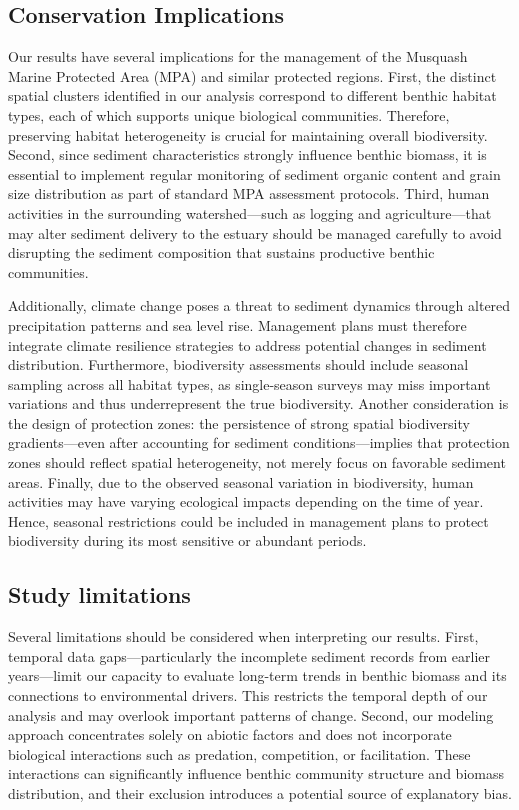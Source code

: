 \documentclass[12pt]{article}
\begin{document}
\subsection{Conservation Implications}

\qquad Our results have several implications for the management of the Musquash
Marine Protected Area (MPA) and similar protected regions. First, the distinct
spatial clusters identified in our analysis correspond to different benthic
habitat types, each of which supports unique biological communities. Therefore,
preserving habitat heterogeneity is crucial for maintaining overall
biodiversity. Second, since sediment characteristics strongly influence benthic
biomass, it is essential to implement regular monitoring of sediment organic
content and grain size distribution as part of standard MPA assessment
protocols. Third, human activities in the surrounding watershed—such as logging
and agriculture—that may alter sediment delivery to the estuary should be
managed carefully to avoid disrupting the sediment composition that sustains
productive benthic communities.

\qquad Additionally, climate change poses a threat to sediment dynamics through
altered precipitation patterns and sea level rise. Management plans must
therefore integrate climate resilience strategies to address potential changes
in sediment distribution. Furthermore, biodiversity assessments should include
seasonal sampling across all habitat types, as single-season surveys may miss
important variations and thus underrepresent the true biodiversity. Another
consideration is the design of protection zones: the persistence of strong
spatial biodiversity gradients—even after accounting for sediment
conditions—implies that protection zones should reflect spatial heterogeneity,
not merely focus on favorable sediment areas. Finally, due to the observed
seasonal variation in biodiversity, human activities may have varying ecological
impacts depending on the time of year. Hence, seasonal restrictions could be
included in management plans to protect biodiversity during its most sensitive
or abundant periods.

\subsection{Study limitations}

\qquad Several limitations should be considered when interpreting our results.
First, temporal data gaps—particularly the incomplete sediment records from
earlier years—limit our capacity to evaluate long-term trends in benthic biomass
and its connections to environmental drivers. This restricts the temporal depth
of our analysis and may overlook important patterns of change. Second, our
modeling approach concentrates solely on abiotic factors and does not
incorporate biological interactions such as predation, competition, or
facilitation. These interactions can significantly influence benthic community
structure and biomass distribution, and their exclusion introduces a potential
source of explanatory bias.
\end{document}

